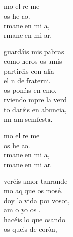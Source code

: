 \documentclass[12pt]{article}
\begin{document}
\begin{multicols*}{2}
\begin{cancion}[Amaos][Kairoi]%
	\begin{chorus}%
	mo el re me  \\
	 os he ao.\\
	rmane en mi a,\\
	rmane en mi ar.\\
	\end{chorus}%
	guardáis mis pabras\\
	como heros os amis\\
	partiréis con alía\\
	el n de fraterni.\\
	os ponéis en cino,\\
	rviendo mpre la verd\\
	to daréis en abuncia,\\
	mi am senifesta.\\
	\begin{chorus}%
	mo el re me  \\
	 os he ao.\\
	rmane en mi a,\\
	rmane en mi ar.\\
	\end{chorus}%
	veréis amor tanrande\\
	mo aq que os mosé.\\
	doy la vida por vosot,\\
	am o yo os . \\
	hacéis lo que osando\\
	os queis de corón,\\

\end{cancion}
\end{multicols*}
\end{document}
